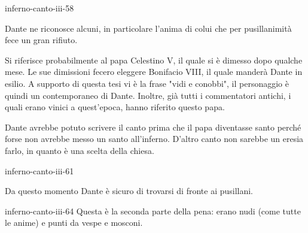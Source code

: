 \documentclass[preview]{standalone}
\begin{document}
\begin{snippet}{inferno-canto-iii-58}
    
    Dante ne riconosce alcuni, in particolare l'anima di colui
    che per pusillanimità fece un gran rifiuto.

    Si riferisce probabilmente al papa Celestino V, il quale si è dimesso
    dopo qualche mese. Le sue dimissioni fecero eleggere Bonifacio VIII, il quale manderà Dante in esilio.
    A supporto di questa tesi vi è la frase "vidi e conobbi", il personaggio è quindi un contemporaneo
    di Dante. Inoltre, già tutti i commentatori antichi, i quali erano vinici a quest'epoca,
    hanno riferito questo papa.

    Dante avrebbe potuto scrivere il canto prima che il papa diventasse santo
    perché forse non avrebbe messo un santo all'inferno.
    D'altro canto non sarebbe un eresia farlo, in quanto è una scelta della chiesa.
\end{snippet}

\begin{snippet}{inferno-canto-iii-61}

    Da questo momento Dante è sicuro di trovarsi di fronte ai pusillani.
\end{snippet}

\begin{snippet}{inferno-canto-iii-64}
    Questa è la seconda parte della pena: erano nudi (come tutte le anime)
    e punti da vespe e mosconi.
\end{snippet}
\end{document}
